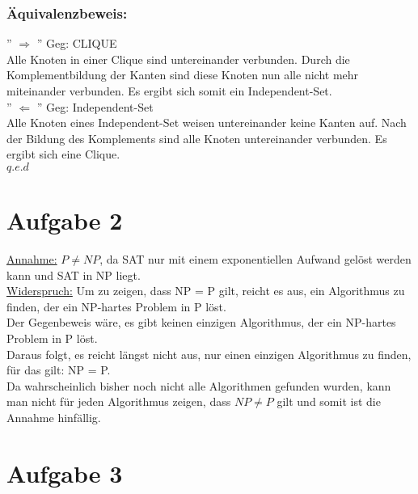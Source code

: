 \documentclass[a4paper,11pt,twoside]{article}
\begin{document}
 \subsubsection*{Äquivalenzbeweis:} 
'' $\Rightarrow$ ''
Geg: CLIQUE\\
Alle Knoten in einer Clique sind untereinander verbunden. Durch die Komplementbildung der Kanten sind diese Knoten nun alle nicht mehr miteinander verbunden. Es ergibt sich somit ein Independent-Set. \\

'' $\Leftarrow$ ''
Geg: Independent-Set\\
Alle Knoten eines Independent-Set weisen untereinander keine Kanten auf. Nach der Bildung des Komplements sind alle Knoten untereinander verbunden. Es ergibt sich eine Clique. \\

$q.e.d$


\section*{Aufgabe 2}
\underline{Annahme:}  $P \neq NP$, da SAT nur mit einem exponentiellen Aufwand gelöst werden kann und SAT in NP liegt.\\
\underline {Widerspruch:} Um zu zeigen, dass NP = P gilt, reicht es aus, ein Algorithmus zu finden, der ein NP-hartes Problem in P löst.\\
Der Gegenbeweis wäre, es gibt keinen einzigen Algorithmus, der ein NP-hartes Problem in P löst. \\
Daraus folgt, es reicht längst nicht aus, nur einen einzigen Algorithmus zu finden, für das gilt: NP = P.\\
Da wahrscheinlich bisher noch nicht alle Algorithmen gefunden wurden, kann man nicht für jeden Algorithmus zeigen, dass $NP \neq P$ gilt und somit ist die Annahme hinfällig.



\section*{Aufgabe 3}
\end{document}
